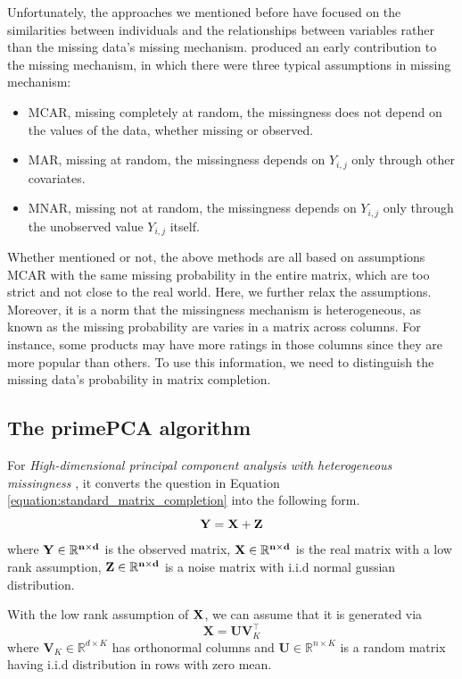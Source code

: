 \documentclass[a4paper,12pt,authoryear]{elegantpaper}
\begin{document}
    Unfortunately, the approaches we mentioned before have focused on the similarities between individuals and the relationships between variables rather than the missing data's missing mechanism. \cite{little_statistical_2019} produced an early contribution to the missing mechanism, in which there were three typical assumptions in missing mechanism:
    \begin{itemize}
        \item MCAR, missing completely at random, the missingness does not depend on the values of the data, whether missing or observed. 
        \item MAR, missing at random, the missingness depends on $Y_{i,j}$ only through other covariates.
        \item MNAR, missing not at random, the missingness depends on $Y_{i,j}$ only through the unobserved value $Y_{i,j}$ itself.
    \end{itemize}
    Whether mentioned or not, the above methods are all based on assumptions MCAR with the same missing probability in the entire matrix, which are too strict and not close to the real world. Here, we further relax the assumptions. Moreover, it is a norm that the missingness mechanism is heterogeneous, as known as the missing probability are varies in a matrix across columns. For instance, some products may have more ratings in those columns since they are more popular than others. To use this information, we need to distinguish the missing data's probability in matrix completion.

    \subsection{The primePCA algorithm}

    For \textit{High-dimensional principal component analysis with heterogeneous missingness} \citep{zhu_high-dimensional_2019}, it converts the question in Equation \ref{equation:standard_matrix_completion} into the following form.
    \begin{equation}
        \bf{Y}=\bf{X}+\bf{Z}
    \end{equation}
    where $\bf Y\in\mathbb{R}^{n\times d}$ is the observed matrix, $\bf X\in\mathbb{R}^{n\times d}$ is the real matrix with a low rank assumption, $\bf Z\in\mathbb{R}^{n\times d}$ is a noise matrix with i.i.d normal gussian distribution.

    With the low rank assumption of $\bf X$, we can assume that it is generated via
    \begin{equation}
        \mathbf{X}=\mathbf{U} \mathbf{V}_{K}^{\top}
    \end{equation}
    where $\mathbf{V}_{K}\in\mathbb{R}^{d\times K}$ has orthonormal columns and $\mathbf{U}\in\mathbb{R}^{n\times K}$ is a random matrix having i.i.d distribution in rows with zero mean.
\end{document}
